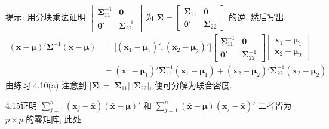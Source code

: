 提示: 用分块乘法证明 $\begin{bmatrix}\boldsymbol{\Sigma}_{11}^{-1}&\mathbf{0}\\[2pt]\mathbf{0}'&\boldsymbol{\Sigma}_{22}^{-1}\end{bmatrix}$ 为 $\boldsymbol{\Sigma}=\begin{bmatrix}\boldsymbol{\Sigma}_{11}&\mathbf{0}\\[2pt]\mathbf{0}'&\boldsymbol{\Sigma}_{22}\end{bmatrix}$ 的逆. 然后写出
\begin{align*}
(\mathbf{x}-\boldsymbol{\mu})'\boldsymbol{\Sigma}^{-1}(\mathbf{x}-\boldsymbol{\mu})
&=\bigl[(\mathbf{x}_{1}-\boldsymbol{\mu}_{1})',(\mathbf{x}_{2}-\boldsymbol{\mu}_{2})'\bigr]
\begin{bmatrix}\boldsymbol{\Sigma}_{11}^{-1}&\mathbf{0}\\[4pt]\mathbf{0}'&\boldsymbol{\Sigma}_{22}^{-1}\end{bmatrix}
\begin{bmatrix}\mathbf{x}_{1}-\boldsymbol{\mu}_{1}\\[4pt]\mathbf{x}_{2}-\boldsymbol{\mu}_{2}\end{bmatrix}\\
&=(\mathbf{x}_{1}-\boldsymbol{\mu}_{1})'\boldsymbol{\Sigma}_{11}^{-1}(\mathbf{x}_{1}-\boldsymbol{\mu}_{1})+(\mathbf{x}_{2}-\boldsymbol{\mu}_{2})'\boldsymbol{\Sigma}_{22}^{-1}(\mathbf{x}_{2}-\boldsymbol{\mu}_{2})
\end{align*}
由练习 4.10(a) 注意到 $|\boldsymbol{\Sigma}|=|\boldsymbol{\Sigma}_{11}|\,|\boldsymbol{\Sigma}_{22}|$, 便可分解为联合密度.

4.15\quad 证明 $\sum\limits_{j=1}^{n}(\mathbf{x}_{j}-\bar{\mathbf{x}})(\bar{\mathbf{x}}-\boldsymbol{\mu})'$ 和 $\sum\limits_{j=1}^{n}(\bar{\mathbf{x}}-\boldsymbol{\mu})(\mathbf{x}_{j}-\bar{\mathbf{x}})'$ 二者皆为 $p\times p$ 的零矩阵, 此处
